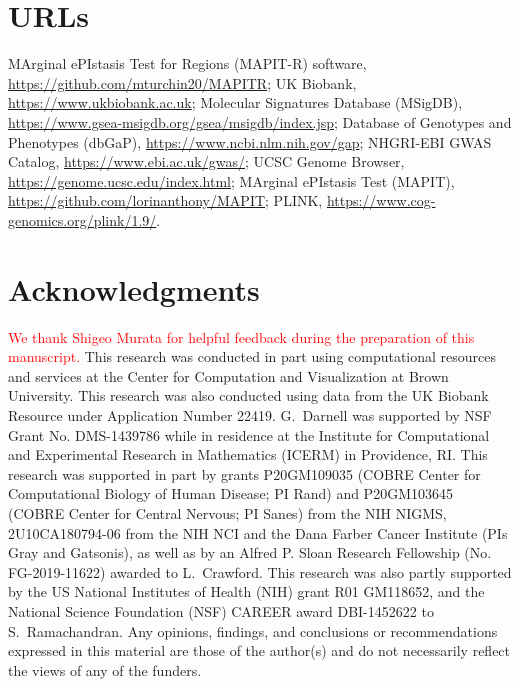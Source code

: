 \documentclass[10pt]{article}
\begin{document}

\section{URLs}\label{InterPath-URLs}

MArginal ePIstasis Test for Regions (MAPIT-R) software, \url{https://github.com/mturchin20/MAPITR}; UK Biobank, \url{https://www.ukbiobank.ac.uk}; Molecular Signatures Database (MSigDB), \url{https://www.gsea-msigdb.org/gsea/msigdb/index.jsp}; Database of Genotypes and Phenotypes (dbGaP), \url{https://www.ncbi.nlm.nih.gov/gap}; NHGRI-EBI GWAS Catalog, \url{https://www.ebi.ac.uk/gwas/}; UCSC Genome Browser, \url{https://genome.ucsc.edu/index.html}; MArginal ePIstasis Test (MAPIT), \url{https://github.com/lorinanthony/MAPIT}; PLINK, \url{https://www.cog-genomics.org/plink/1.9/}.


\section*{Acknowledgments}\label{InterPath-Acknowledgments}

\textcolor{red}{We thank Shigeo Murata for helpful feedback during the preparation of this manuscript.} This research was conducted in part using computational resources and services at the Center for Computation and Visualization at Brown University. This research was also conducted using data from the UK Biobank Resource under Application Number 22419. G.~Darnell was supported by NSF Grant No. DMS-1439786 while in residence at the Institute for Computational and Experimental Research in Mathematics (ICERM) in Providence, RI. This research was supported in part by grants P20GM109035 (COBRE Center for Computational Biology of Human Disease; PI Rand) and P20GM103645 (COBRE Center for Central Nervous; PI Sanes) from the NIH NIGMS, 2U10CA180794-06 from the NIH NCI and the Dana Farber Cancer Institute (PIs Gray and Gatsonis), as well as by an Alfred P. Sloan Research Fellowship (No. FG-2019-11622) awarded to L.~Crawford. This research was also partly supported by the US National Institutes of Health (NIH) grant R01 GM118652, and the National Science Foundation (NSF) CAREER award DBI-1452622 to S.~Ramachandran. Any opinions, findings, and conclusions or recommendations expressed in this material are those of the author(s) and do not necessarily reflect the views of any of the funders.
\end{document}
